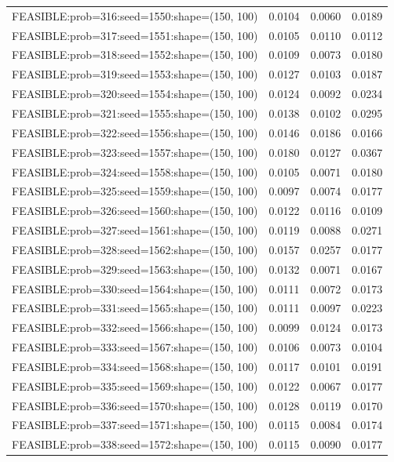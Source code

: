 \begin{longtable}{lccc}
FEASIBLE:prob=316:seed=1550:shape=(150, 100) &   0.0104 & 0.0060 & 0.0189 \\
FEASIBLE:prob=317:seed=1551:shape=(150, 100) &   0.0105 & 0.0110 & 0.0112 \\
FEASIBLE:prob=318:seed=1552:shape=(150, 100) &   0.0109 & 0.0073 & 0.0180 \\
FEASIBLE:prob=319:seed=1553:shape=(150, 100) &   0.0127 & 0.0103 & 0.0187 \\
FEASIBLE:prob=320:seed=1554:shape=(150, 100) &   0.0124 & 0.0092 & 0.0234 \\
FEASIBLE:prob=321:seed=1555:shape=(150, 100) &   0.0138 & 0.0102 & 0.0295 \\
FEASIBLE:prob=322:seed=1556:shape=(150, 100) &   0.0146 & 0.0186 & 0.0166 \\
FEASIBLE:prob=323:seed=1557:shape=(150, 100) &   0.0180 & 0.0127 & 0.0367 \\
FEASIBLE:prob=324:seed=1558:shape=(150, 100) &   0.0105 & 0.0071 & 0.0180 \\
FEASIBLE:prob=325:seed=1559:shape=(150, 100) &   0.0097 & 0.0074 & 0.0177 \\
FEASIBLE:prob=326:seed=1560:shape=(150, 100) &   0.0122 & 0.0116 & 0.0109 \\
FEASIBLE:prob=327:seed=1561:shape=(150, 100) &   0.0119 & 0.0088 & 0.0271 \\
FEASIBLE:prob=328:seed=1562:shape=(150, 100) &   0.0157 & 0.0257 & 0.0177 \\
FEASIBLE:prob=329:seed=1563:shape=(150, 100) &   0.0132 & 0.0071 & 0.0167 \\
FEASIBLE:prob=330:seed=1564:shape=(150, 100) &   0.0111 & 0.0072 & 0.0173 \\
FEASIBLE:prob=331:seed=1565:shape=(150, 100) &   0.0111 & 0.0097 & 0.0223 \\
FEASIBLE:prob=332:seed=1566:shape=(150, 100) &   0.0099 & 0.0124 & 0.0173 \\
FEASIBLE:prob=333:seed=1567:shape=(150, 100) &   0.0106 & 0.0073 & 0.0104 \\
FEASIBLE:prob=334:seed=1568:shape=(150, 100) &   0.0117 & 0.0101 & 0.0191 \\
FEASIBLE:prob=335:seed=1569:shape=(150, 100) &   0.0122 & 0.0067 & 0.0177 \\
FEASIBLE:prob=336:seed=1570:shape=(150, 100) &   0.0128 & 0.0119 & 0.0170 \\
FEASIBLE:prob=337:seed=1571:shape=(150, 100) &   0.0115 & 0.0084 & 0.0174 \\
FEASIBLE:prob=338:seed=1572:shape=(150, 100) &   0.0115 & 0.0090 & 0.0177 \\

\end{longtable}
